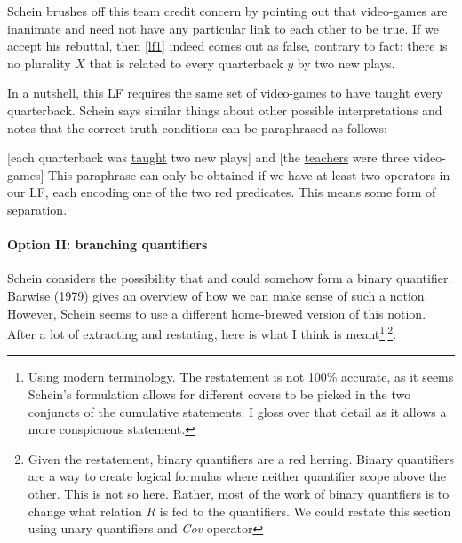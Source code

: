 \documentclass[english]{article}
\begin{document}
Schein brushes off this team credit concern by pointing out that video-games are inanimate and need not have any particular link to each other to be true\footnotemark{}. If we accept his rebuttal, then \cref{lf1} indeed comes out as false, contrary to fact: there is no plurality $X$ that is related to every quarterback $y$ by two new plays.

In a nutshell, this LF requires the same set of video-games to have taught every quarterback. Schein says similar things about other possible interpretations and notes that the correct truth-conditions can be paraphrased as follows:

\ex{}%
[each quarterback was \underline{taught} two new plays] and [the \underline{teachers} were three video-games]
\xe
%
This paraphrase can only be obtained if we have at least two operators in our LF, each encoding one of the two red predicates. This means some form of separation.


\paragraph{Option II: branching quantifiers} Schein considers the possibility that  and  could somehow form a binary quantifier. Barwise (1979) gives an overview of how we can make sense of such a notion. However, Schein seems to use a different home-brewed version of this notion. After a lot of extracting and restating, here is what I think is meant\footnote{Using modern terminology. The restatement is not 100\% accurate, as it seems Schein's formulation allows for different covers to be picked in the two conjuncts of the cumulative statements. I gloss over that detail as it allows a more conspicuous statement.}\textsuperscript{,}\footnote{Given the restatement, binary quantifiers are a red herring. Binary quantifiers are a way to create logical formulas where neither quantifier scope above the other. This is not so here. Rather, most of the work of binary quantfiers is to change what relation $R$ is fed to the quantifiers. We could restate this section using unary quantifiers and \emph{Cov} operator}:
\end{document}
